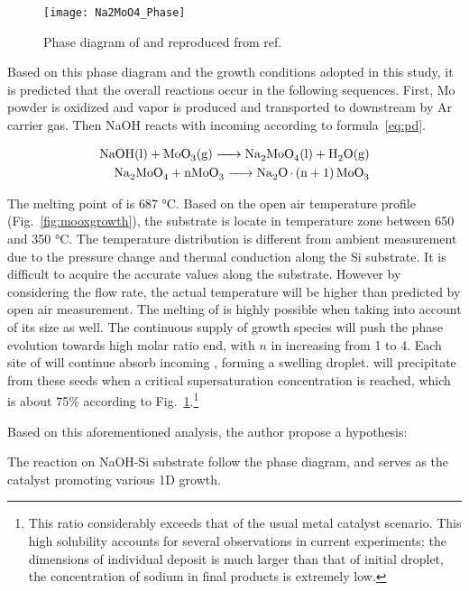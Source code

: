 \begin{figure}[htb]
\centering
\texttt{[image: Na2MoO4\_Phase]}
\caption[Phase diagram of Na-Mo-O system]{Phase diagram of  and  reproduced from ref.~\cite{Hoermann1929}}
\label{fig:ch4pd}
\end{figure}

Based on this phase diagram and the growth conditions adopted in this study, it is predicted that the overall reactions occur in the following sequences. First, Mo powder is oxidized and  vapor is produced and transported to downstream by Ar carrier gas. Then NaOH reacts with incoming  according to formula~\ref{eq:pd}. 

\begin{align}\label{eq:pd}
\cee{NaOH(l) + MoO3(g) -> Na2MoO4(l) + H2O(g)}\\
\cee{Na2MoO4 + nMoO3   -> Na2O.(n + 1)MoO3}
\end{align}

The melting point of  is 687 \si{\degreeCelsius}. Based on the open air temperature profile (Fig.~\ref{fig:mooxgrowth}), the substrate is locate in temperature zone between 650 and 350 \si{\degreeCelsius}. The temperature distribution is different from ambient measurement due to the pressure change and thermal conduction along the Si substrate. It is difficult to acquire the accurate values along the substrate. However by considering the flow rate, the actual temperature will be higher than predicted by open air measurement.\cite{Subannajui2010} The melting of  is highly possible when taking into account of its size as well.\cite{Bruggemann1997} The continuous supply of  growth species will push the phase evolution towards high  molar ratio end, with $n$ in  increasing from 1 to 4. Each site of  will continue absorb incoming , forming a swelling droplet.  will precipitate from these seeds when a critical supersaturation concentration is reached, which is about 75\% according to Fig.~\ref{fig:ch4pd}.\footnote{This ratio considerably exceeds that of the usual metal catalyst scenario. This high solubility accounts for several observations in current experiments: the dimensions of individual deposit is much larger than that of initial droplet, the concentration of sodium in final products is extremely low.}

Based on this aforementioned analysis, the author propose a hypothesis:
\begin{hypothesis}\label{hypo1}
The reaction on NaOH-Si substrate follow the phase diagram, and  serves as the catalyst promoting various 1D  growth. 
\end{hypothesis}

